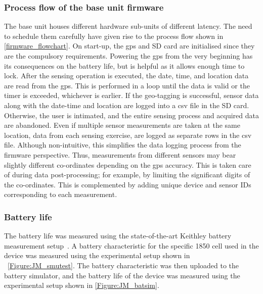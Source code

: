 \subsubsection{Process flow of the base unit firmware}\label{appendix:processflow}

The base unit houses different hardware sub-units of different latency. The need to schedule them carefully have given rise to the process flow shown in \cref{firmware_flowchart}. On start-up, the \gls{gps} and SD card are initialised since they are the compulsory requirements. Powering the \gls{gps} from the very beginning has its consequences on the battery life, but is helpful as it allows enough time to lock. After the sensing operation is executed, the date, time, and location data are read from the \gls{gps}. This is performed in a loop until the data is valid or the timer is exceeded, whichever is earlier. If the geo-tagging is successful, sensor data along with the date-time and location are logged into a \gls{csv} file in the SD card. Otherwise, the user is intimated, and the entire sensing process and acquired data are abandoned. Even if multiple sensor measurements are taken at the same location, data from each sensing exercise, are logged as separate rows in the \gls{csv} file. Although non-intuitive, this simplifies the data logging process from the firmware perspective. Thus, measurements from different sensors may bear slightly different co-ordinates depending on the \gls{gps} accuracy. This is taken care of during data post-processing; for example, by limiting the significant digits of the co-ordinates. This is complemented by adding unique device and sensor IDs corresponding to each measurement.

\subsubsection{Battery life} 
The battery life was measured using the state-of-the-art Keithley battery measurement setup~\cite{JM_batTestSetup}. A battery characteristic for the specific 1850 cell used in the device was measured using the experimental setup shown in ~\cref{Figure:JM_smutest}. The battery characteristic was then uploaded to the battery simulator, and the battery life of the device was measured using the experimental setup shown in \cref{Figure:JM_batsim}. 

